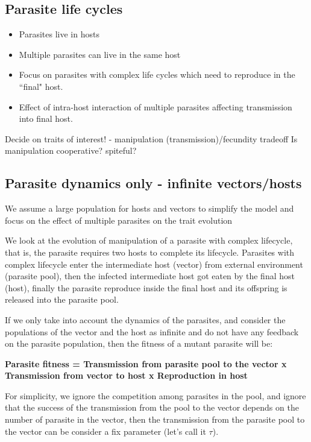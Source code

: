 \documentclass{article}
\begin{document}
\subsection{Parasite life cycles}
\begin{itemize}
	\item Parasites live in hosts
	\item Multiple parasites can live in the same host
	\item Focus on parasites with complex life cycles which need to reproduce in the ``final" host.
	\item Effect of intra-host interaction of multiple parasites affecting transmission into final host. 
\end{itemize}

Decide on traits of interest! - manipulation (transmission)/fecundity tradeoff
Is manipulation cooperative? spiteful?

\subsection{Parasite dynamics only - infinite vectors/hosts}

We assume a large population for hosts and vectors to simplify the model and focus on the effect of multiple parasites on the trait evolution

We look at the evolution of manipulation of a parasite with complex lifecycle, that is, the parasite requires two hosts to complete its lifecycle. Parasites with complex lifecycle enter the intermediate host (vector) from external environment (parasite pool), then the infected intermediate host got eaten by the final host (host), finally the parasite reproduce inside the final host and its offspring is released into the parasite pool.

If we only take into account the dynamics of the parasites, and consider the populations of the vector and the host as infinite and do not have any feedback on the parasite population, then the fitness of a mutant parasite will be:

\textbf{Parasite fitness = Transmission from parasite pool to the vector x Transmission from vector to host x Reproduction in host}

For simplicity, we ignore the competition among parasites in the pool, and ignore that the success of the transmission from the pool to the vector depends on the number of parasite in the vector, then the transmission from the parasite pool to the vector can be consider a fix parameter (let's call it $\tau$).
\end{document}
